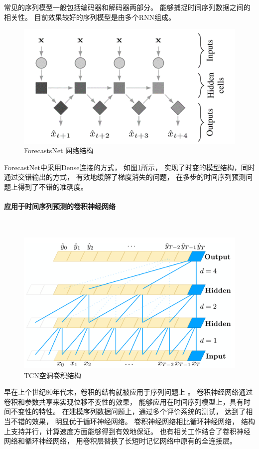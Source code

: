     常见的序列模型一般包括编码器和解码器两部分。
    能够捕捉时间序列数据之间的相关性。
    目前效果较好的序列模型是由多个RNN组成。

    \begin{figure}
      \centering
      \includegraphics[width=0.8\linewidth]{figures/ForecastsNet 网络结构.png}
      \caption{ForecastsNet 网络结构}
      \label{tab:ForecastsNet}
    \end{figure}

    ForecastNet\cite{dabrowski2020forecastnet}中采用Dense连接的方式，
    如图\ref{tab:ForecastsNet}所示，
    实现了时变的模型结构，同时通过交错输出的方式，
    有效地缓解了梯度消失的问题，
    在多步的时间序列预测问题上得到了不错的准确度。  
  
  \paragraph{应用于时间序列预测的卷积神经网络}~{}
  
    \begin{figure}
      \centering
      \includegraphics[width=0.8\linewidth]{figures/TCN空洞卷积结构.png}
      \caption{TCN空洞卷积结构}
      \label{tab:TCN}
    \end{figure}
    早在上个世纪80年代末，卷积的结构就被应用于序列问题上
    \cite{lecun1989backpropagation}。
    卷积神经网络通过卷积和参数共享来实现位移不变性的效果\cite{amari2003handbook}，
    能够应用在时间序列模型上，具有时间不变性的特性。
    在建模序列数据问题上，通过多个评价系统\cite{chung2014empirical}的测试，
    达到了相当不错的效果，
    明显优于循环神经网络\cite{binkowski2018autoregressive}。
    卷积神经网络相比循环神经网络，
    结构上支持并行，计算速度方面能够得到有效地保证。
    也有相关工作\cite{shi2015convolutional}结合了卷积神经网络和循环神经网络，
    用卷积层替换了长短时记忆网络中原有的全连接层。

